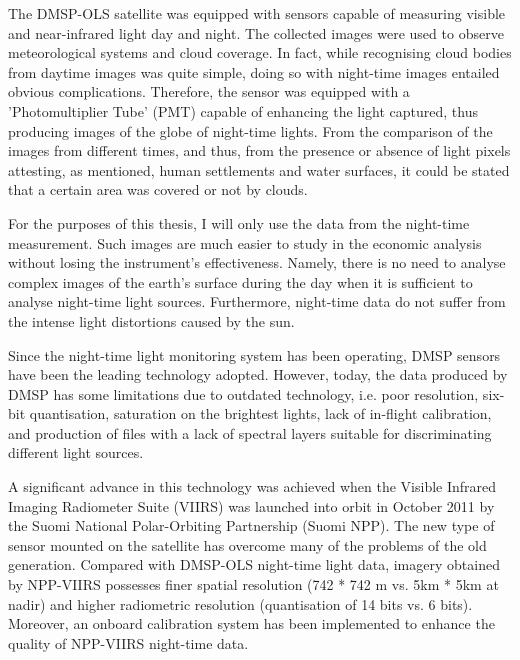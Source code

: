The DMSP-OLS satellite was equipped with sensors capable of measuring visible and near-infrared light day and night. The collected images were used to observe meteorological systems and cloud coverage. 
In fact, while recognising cloud bodies from daytime images was quite simple, doing so with night-time images entailed obvious complications. Therefore, the sensor  was equipped with a 'Photomultiplier Tube' (PMT) capable of enhancing the light captured, thus producing images of the globe of night-time lights. From the comparison of the images from different times, and thus, from the presence or absence of light pixels attesting, as mentioned, human settlements and water surfaces, it could be stated that a certain area was covered or not by clouds.

For the purposes of this thesis, I will only use the data from the night-time measurement. Such images are much easier to study in the economic analysis without losing the instrument's effectiveness. Namely, there is no need to analyse complex images of the earth's surface during the day when it is sufficient to analyse night-time light sources. Furthermore, night-time data do not suffer from the intense light distortions caused by the sun.

Since the night-time light monitoring system has been operating, DMSP sensors have been the leading technology adopted. However, today, the data produced by DMSP has some limitations due to outdated technology, i.e. poor resolution, six-bit quantisation, saturation on the brightest lights, lack of in-flight calibration, and production of files with a lack of spectral layers suitable for discriminating different light sources.

A significant advance in this technology was achieved when the Visible Infrared Imaging Radiometer Suite (VIIRS) was launched into orbit in October 2011 by the Suomi National Polar-Orbiting Partnership (Suomi NPP). The new type of sensor mounted on the satellite has overcome many of the problems of the old generation. Compared with DMSP-OLS night-time light data, imagery obtained by NPP-VIIRS possesses finer spatial resolution (742 * 742 m vs. 5km * 5km at nadir) and higher radiometric resolution (quantisation of 14 bits vs. 6 bits). Moreover, an onboard calibration system has been implemented to enhance the quality of NPP-VIIRS night-time data. 

